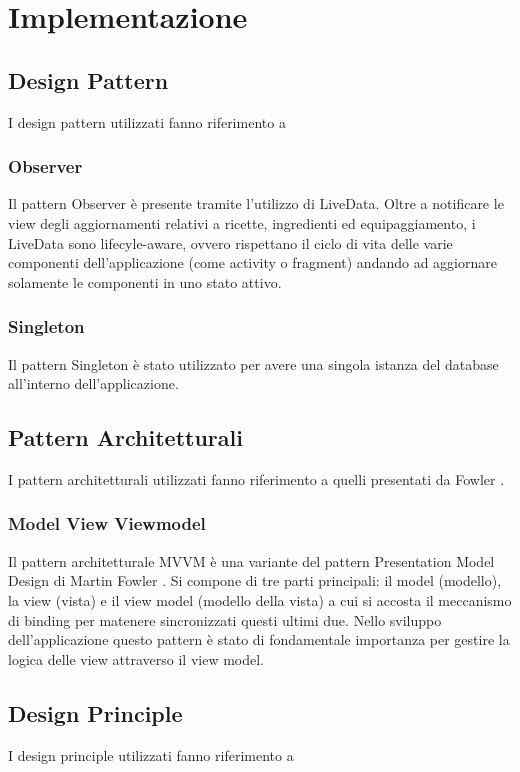 \documentclass[12pt]{article}
\begin{document}
\section{Implementazione}

\subsection{Design Pattern }
I design pattern utilizzati fanno riferimento a \cite{martin2000design}

\subsubsection{Observer}
Il pattern Observer è presente tramite l'utilizzo di LiveData. Oltre a notificare le view degli aggiornamenti relativi a ricette, ingredienti ed equipaggiamento, i LiveData sono lifecyle-aware, ovvero rispettano il ciclo di vita delle varie componenti dell'applicazione (come activity o fragment) andando ad aggiornare solamente le componenti in uno stato attivo.

\subsubsection{Singleton}
Il pattern Singleton è stato utilizzato per avere una singola istanza del database all'interno dell'applicazione.

\subsection{Pattern Architetturali}
I pattern architetturali utilizzati fanno riferimento a quelli presentati da Fowler \cite{fowler2012patterns}.

\subsubsection{Model View Viewmodel}
Il pattern architetturale MVVM è una variante del pattern Presentation Model Design di Martin Fowler \cite{fowler2012patterns}. Si compone di tre parti principali: il model (modello), la view (vista) e il view model (modello della vista) a cui si accosta il meccanismo di binding per matenere sincronizzati questi ultimi due. Nello sviluppo dell'applicazione questo pattern è stato di fondamentale importanza per gestire la logica delle view attraverso il view model.


\subsection{Design Principle}
I design principle utilizzati fanno riferimento a \cite{martin2000design}
\end{document}
